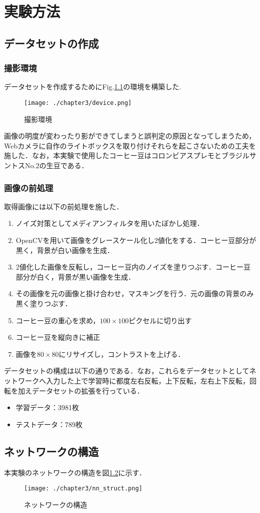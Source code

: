 
\chapter{実験方法}

\section{データセットの作成}
\subsection{撮影環境}
データセットを作成するためにFig.\ref{fig_camera}の環境を構築した.
\begin{figure}[]
  \begin{center}
    \texttt{[image: ./chapter3/device.png]}
    \caption{撮影環境}
    \label{fig_camera}
  \end{center}
\end{figure}
画像の明度が変わったり影ができてしまうと誤判定の原因となってしまうため，Webカメラに自作のライトボックスを取り付けそれらを起こさないための工夫を施した．なお，本実験で使用したコーヒー豆はコロンビアスプレモとブラジルサントスNo.2の生豆である．

\subsection{画像の前処理}
取得画像には以下の前処理を施した．
\begin{enumerate}
\item ノイズ対策としてメディアンフィルタを用いたぼかし処理．
\item OpenCVを用いて画像をグレースケール化し2値化をする．コーヒー豆部分が黒く，背景が白い画像を生成．
\item 2値化した画像を反転し，コーヒー豆内のノイズを塗りつぶす．コーヒー豆部分が白く，背景が黒い画像を生成．
\item その画像を元の画像と掛け合わせ，マスキングを行う．元の画像の背景のみ黒く塗りつぶす．
\item コーヒー豆の重心を求め，$100\times 100$ピクセルに切り出す
\item コーヒー豆を縦向きに補正
\item 画像を$80\times 80$にリサイズし，コントラストを上げる．
\end{enumerate}

データセットの構成は以下の通りである．なお，これらをデータセットとしてネットワークへ入力した上で学習時に都度左右反転，上下反転，左右上下反転，回転を加えデータセットの拡張を行っている．
\begin{itemize}
  \item 学習データ：3981枚
  \item テストデータ：789枚
\end{itemize}

\section{ネットワークの構造}
本実験のネットワークの構造を図\ref{fig_nnst}に示す．
\begin{figure}[]
  \begin{center}
    \texttt{[image: ./chapter3/nn\_struct.png]}
    \caption{ネットワークの構造}
    \label{fig_nnst}
  \end{center}
\end{figure}